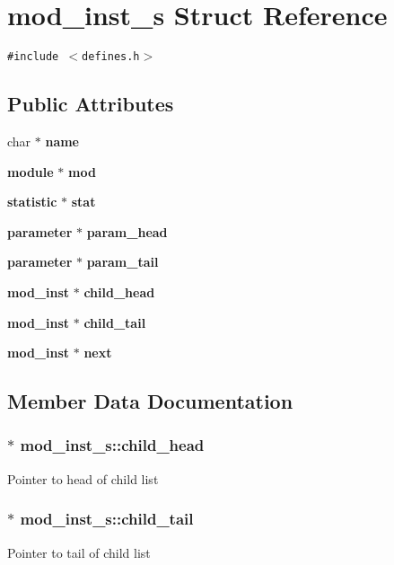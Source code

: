 \section{mod\_\-inst\_\-s  Struct Reference}
\label{structmod__inst__s}
{\tt \#include $<$defines.h$>$}

\subsection*{Public Attributes}
\begin{CompactItemize}
\item 
char $\ast$ {\bf name}
\item 
{\bf module} $\ast$ {\bf mod}
\item 
{\bf statistic} $\ast$ {\bf stat}
\item 
{\bf parameter} $\ast$ {\bf param\_\-head}
\item 
{\bf parameter} $\ast$ {\bf param\_\-tail}
\item 
{\bf mod\_\-inst} $\ast$ {\bf child\_\-head}
\item 
{\bf mod\_\-inst} $\ast$ {\bf child\_\-tail}
\item 
{\bf mod\_\-inst} $\ast$ {\bf next}
\end{CompactItemize}


\subsection{Member Data Documentation}
\subsubsection{$\ast$ mod\_\-inst\_\-s::child\_\-head}\label{structmod__inst__s_m5}


Pointer to head of child list 
\subsubsection{$\ast$ mod\_\-inst\_\-s::child\_\-tail}\label{structmod__inst__s_m6}


Pointer to tail of child list 
